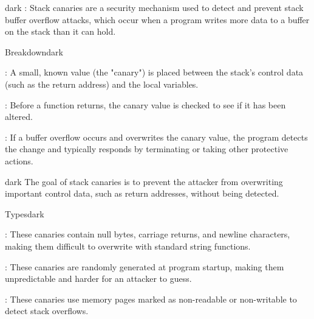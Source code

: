 \label{Stack Canaries}
\begin{baseBoxThree}{}{dark}
    \bigskip
    : Stack canaries are a security mechanism used to detect and prevent stack buffer overflow attacks, which occur when a program writes more data to a buffer on the stack than it can hold.
    \bigskip
    \begin{baseBoxThree}{Breakdown}{dark}
        \smallskip
        \begin{posnexItemize}
            \item[\sA] : A small, known value (the "canary") is placed between the stack's control data (such as the return address) and the local variables.
            \item[\sA] : Before a function returns, the canary value is checked to see if it has been altered.
            \item[\sA] : If a buffer overflow occurs and overwrites the canary value, the program detects the change and typically responds by terminating or taking other protective actions.
        \end{posnexItemize}
        \smallskip
        \begin{baseBoxThree}{}{dark}
            The goal of stack canaries is to prevent the attacker from overwriting important control data, such as return addresses, without being detected.
        \end{baseBoxThree}
        \smallskip
    \end{baseBoxThree}
    \smallskip
    \label{Types of Canaries}
    \begin{baseBoxThree}{Types}{dark}
        \smallskip
        \begin{posnexItemize}
            \item[\sA] : These canaries contain null bytes, carriage returns, and newline characters, making them difficult to overwrite with standard string functions.
            \item[\sA] : These canaries are randomly generated at program startup, making them unpredictable and harder for an attacker to guess.
            \item[\sA] : These canaries use memory pages marked as non-readable or non-writable to detect stack overflows.
        \end{posnexItemize}

\end{baseBoxThree}
\end{baseBoxThree}

